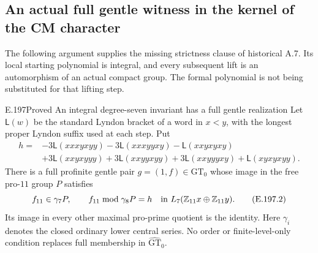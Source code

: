 \subsection{An actual full gentle witness in the kernel of the CM character}

The following argument supplies the missing strictness clause of
historical A.7.  Its local starting polynomial is integral, and every
subsequent lift is an automorphism of an actual compact group.
The formal polynomial is not being substituted for that lifting step.

\begin{result}{E.197}{Proved}
{An integral degree-seven invariant has a full gentle realization}
Let \(\mathsf L(w)\) be the standard Lyndon bracket of a word in
\(x<y\), with the longest proper Lyndon suffix used at each step.
Put
\[
\begin{split}
h={}&-3\mathsf L(xxxyxyy)-3\mathsf L(xxxyyxy)
       -\mathsf L(xxyxyxy)\\
   &+3\mathsf L(xxyxyyy)+3\mathsf L(xxyyxyy)
       +3\mathsf L(xxyyyxy)+\mathsf L(xyxyxyy).
\end{split}
\tag{E.197.1}
\]
There is a full profinite gentle pair
\(g=(1,f)\in\widehat{\mathrm{GT}}_0\) whose image in the
free pro-\(11\) group \(P\) satisfies
\[
 f_{11}\in\gamma_7P,\qquad
 f_{11}\bmod\gamma_8P=h
       \quad\hbox{in }L_7(\mathbb Z_{11}x\oplus\mathbb Z_{11}y).
\tag{E.197.2}
\]
Its image in every other maximal pro-prime quotient is the identity.
Here \(\gamma_i\) denotes the closed ordinary lower central series.
No order or finite-level-only condition replaces full membership in
\(\widehat{\mathrm{GT}}_0\).
\end{result}

